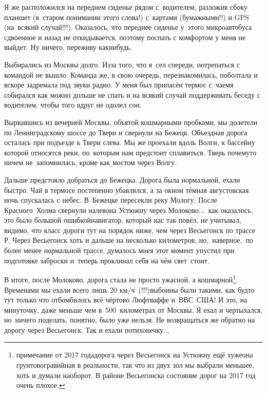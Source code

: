 Я же расположился на переднем сиденье рядом с~водителем, разложив сбоку планшет (в~старом понимании этого слова!) с~картами (бумажными!!) и GPS (на~всякий случай!!!). Оказалось, что переднее сиденье у~этого микроавтобуса сдвоенное и назад не откидывается, поэтому поспать с комфортом у меня не выйдет. Ну ничего, переживу как\sdash нибудь. 

Выбирались из Москвы долго. Из\sdash за того, что я~сел спереди, потрепаться с командой не вышло. Команда же, в свою очередь, перезнакомилась, поболтала и вскоре задремала под звуки радио. У меня был припасён термос с~чаем\mdash я собирался как можно дольше не спать и на всякий случай поддерживать беседу с водителем, чтобы того вдруг не одолел сон. 

Вырвавшись из вечерней Москвы, объятой кошмарными пробками, мы долетели по Ленинградскому шоссе до Твери и свернули на Бежецк. Объездная дорога осталась при подъезде к Твери слева. Мы же проехали вдоль Волги, к бассейну которой относятся реки, по~которым нам предстоит сплавиться. Тверь почему\sdash то ничем не~запомнилась, кроме как мостом через Волгу. 

Дальше предстояло добраться до Бежецка. Дорога была нормальной, ехали быстро. Чай в термосе постепенно убавлялся, а за окном тёмная августовская ночь спускалась с небес. В~Бежецке пересекли реку Мологу. После Красного~Холма свернули налево\mdash на Устюжну через Молоково$\ldots$~как оказалось, это было большой ошибкой\mdash навигатор, который нас так повёл, не учитывал, видимо, что класс дороги тут на порядок ниже, чем через Весьегонск по трассе Р. Через Весьегонск хоть и дальше на несколько километров, но,~наверное,~по более менее нормальной трассе, думалось мне\mdash я этот момент упустил при подготовке заброски и~теперь проклинал себя на чём свет~стоит.


\renewcommand*{\thefootnote}{\fnsymbol{footnote}}
В итоге, после Молоково, дорога стала не просто ужасной, а кошмарной\footnote{примечание от 2017 года\mdash дорога через Весьегонск на Устюжну ещё хуже\mdash она грунтово\sdash гравийная в реальности, так что из двух зол мы выбрали меньшее, хоть и думали наоборот. В районе Весьегонска состояние дорог на 2017 год очень плохое.}. Временами мы ехали всего лишь 20\thinspace\nbdash{} км/ч~(!!!)\mdash выбоины были такими, как будто тут только что отбомбилось всё чёртово Люфтваффе и~ВВС~США! И это, на минуточку, даже меньше чем в~500~километрах от Москвы. Я ехал и чертыхался, но~ничего поделать, понятно, было уже нельзя. Не возвращаться же обратно на дорогу через Весьегонск. Так и ехали потихонечку$\ldots$ 

